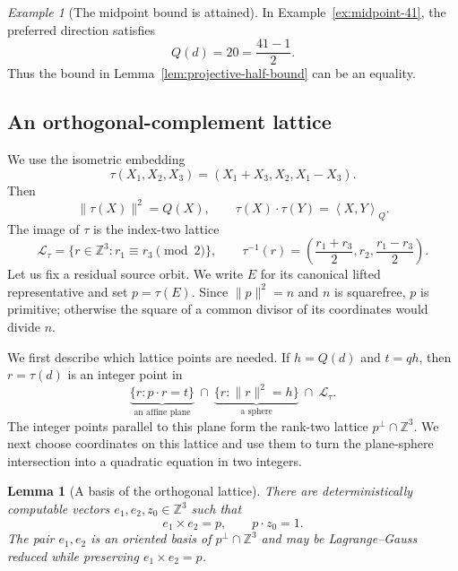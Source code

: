 \documentclass[11pt]{amsart}
\newtheorem{lemma}[theorem]{Lemma}
\theoremstyle{definition}
\theoremstyle{remark}
\newtheorem{example}[theorem]{Example}
\newcommand{\Z}{\mathbb Z}
\newcommand{\Qip}[2]{\left\langle #1,#2\right\rangle_Q}
\begin{document}
\begin{example}[The midpoint bound is attained]
In Example~\ref{ex:midpoint-41}, the preferred direction satisfies
\[
 Q(d)=20=\frac{41-1}{2}.
\]
Thus the bound in Lemma~\ref{lem:projective-half-bound} can be an equality.
\end{example}

\subsection{An orthogonal-complement lattice}

We use the isometric embedding
\[
 \tau(X_1,X_2,X_3)=(X_1+X_3,X_2,X_1-X_3).
\]
Then
\[
 \|\tau(X)\|^2=Q(X),
 \qquad
 \tau(X)\cdot\tau(Y)=\Qip{X}{Y}.
\]
The image of $\tau$ is the index-two lattice
\begin{equation}\label{eq:tau-lattice}
 \mathcal L_\tau=\{r\in\Z^3:r_1\equiv r_3\pmod2\},
 \qquad
 \tau^{-1}(r)=
 \left(\frac{r_1+r_3}{2},r_2,\frac{r_1-r_3}{2}\right).
\end{equation}
Let us fix a residual source orbit.  We write $E$ for its canonical lifted
representative and set $p=\tau(E)$.  Since $\|p\|^2=n$ and $n$ is squarefree,
$p$ is primitive; otherwise the square of a common divisor of its coordinates
would divide $n$.

We first describe which lattice points are needed.
If $h=Q(d)$ and $t=qh$, then $r=\tau(d)$ is an integer point in
\begin{equation}\label{eq:plane-sphere}
 \underbrace{\{r:p\cdot r=t\}}_{\text{an affine plane}}
 \ \cap\ 
 \underbrace{\{r:\|r\|^2=h\}}_{\text{a sphere}}
 \ \cap\ \mathcal L_\tau.
\end{equation}
The integer points parallel to this plane form the rank-two lattice
$p^\perp\cap\Z^3$.  We next choose coordinates on this lattice and use them to
turn the plane-sphere intersection into a quadratic equation in two integers.

\begin{lemma}[A basis of the orthogonal lattice]
\label{lem:orthogonal-frame}
There are deterministically computable vectors $e_1,e_2,z_0\in\Z^3$ such that
\[
 e_1\times e_2=p,
 \qquad
 p\cdot z_0=1.
\]
The pair $e_1,e_2$ is an oriented basis of $p^\perp\cap\Z^3$ and may be
Lagrange--Gauss reduced while preserving $e_1\times e_2=p$.
\end{lemma}
\end{document}
